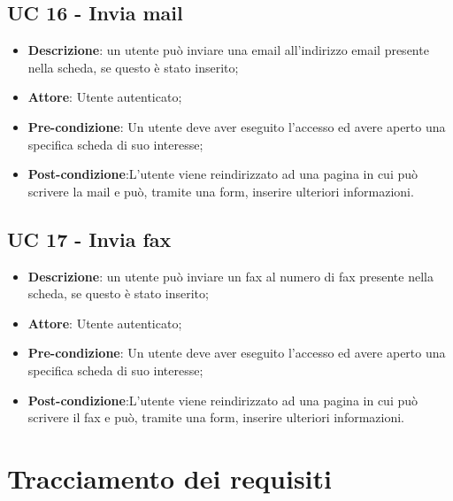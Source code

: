 \subsection{UC 16 - Invia mail}

\begin{itemize}
	\item \textbf{Descrizione}: un utente può inviare una email all'indirizzo email presente nella scheda, se questo è stato inserito;
	\item \textbf{Attore}: Utente autenticato;
	\item \textbf{Pre-condizione}: Un utente deve aver eseguito l'accesso ed avere aperto una specifica scheda di suo interesse;
	\item \textbf{Post-condizione}:L'utente viene reindirizzato ad una pagina in cui può scrivere la mail e può, tramite una form, inserire ulteriori informazioni.
\end{itemize}

\subsection{UC 17 - Invia fax}

\begin{itemize}
	\item \textbf{Descrizione}: un utente può inviare un fax al numero di fax presente nella scheda, se questo è stato inserito;
	\item \textbf{Attore}: Utente autenticato;
	\item \textbf{Pre-condizione}: Un utente deve aver eseguito l'accesso ed avere aperto una specifica scheda di suo interesse;
	\item \textbf{Post-condizione}:L'utente viene reindirizzato ad una pagina in cui può scrivere il fax e può, tramite una form, inserire ulteriori informazioni.
\end{itemize}

\section{Tracciamento dei requisiti}
